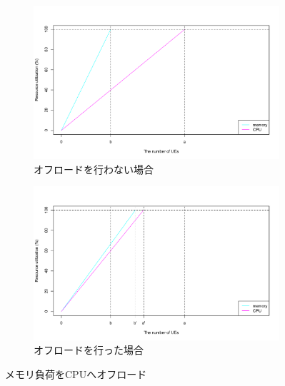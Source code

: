 \documentclass[a4j]{ujarticle}
\begin{document}
\begin{figure}[p]
	\centering
		\begin{subfigure}{1.0\textwidth}
			\includegraphics[width=1.0\hsize]{plot3.pdf}
			\caption{オフロードを行わない場合}
			\label{overmemory}
		\end{subfigure}
		\begin{subfigure}{1.0\textwidth}
			\includegraphics[width=1.0\hsize]{plot4.pdf}
		  \caption{オフロードを行った場合}
			\label{okmemory}
		\end{subfigure}
		\caption{メモリ負荷をCPUへオフロード}
		\label{memory}
\end{figure}
%
%

\clearpage
\end{document}
